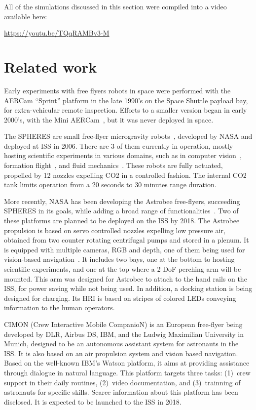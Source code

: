 \documentclass[review]{elsarticle}
\begin{document}
All of the simulations discussed in this section were compiled into a
video available here: \\
\centerline{\url{https://youtu.be/TQqRAMBv3-M}}






\section{Related work}
\label{sec:related-work}

Early experiments with free flyers robots in space were performed with
the AERCam “Sprint” platform in the late 1990’s on the Space Shuttle
payload bay, for extra-vehicular remote inspection. Efforts to a
smaller version began in early 2000’s, with the Mini
AERCam~\cite{wagenknecht03}, but it was never deployed in space.

The SPHERES are small free-flyer microgravity robots~\cite{miller00},
developed by NASA and deployed at ISS in 2006. There are 3 of them
currently in operation, mostly hosting scientific experiments in
various domains, such as in computer vision~\cite{tweddle12},
formation flight~\cite{eslinger13}, and fluid
mechanics~\cite{burke10}. These robots are fully actuated, propelled
by 12 nozzles expelling CO2 in a controlled fashion. The internal CO2
tank limits operation from a 20 seconds to 30 minutes range duration.

More recently, NASA has been developing the Astrobee free-flyers,
succeeding SPHERES in its goals, while adding a broad range of
functionalities~\cite{bualat15}. Two of these platforms are planned to be deployed on
the ISS by 2018. The Astrobee propulsion is based on servo controlled
nozzles expelling low pressure air, obtained from two counter rotating
centrifugal pumps and stored in a plenum. It is equipped with multiple
cameras, RGB and depth, one of them being used for vision-based
navigation~\cite{coltin16}. It includes two bays, one at the bottom to hosting
scientific experiments, and one at the top where a 2 DoF perching arm
will be mounted. This arm was designed for Astrobee to attach to the
hand rails on the ISS, for power saving while not being used. In
addition, a docking station is being designed for charging. Its HRI is
based on stripes of colored LEDs conveying information to the human
operators.

CIMON (Crew Interactive Mobile CompanioN) is an European free-flyer
being developed by DLR, Airbus DS, IBM, and the Ludwig Maximilian
University in Munich, designed to be an autonomous assistant system
for astronauts in the ISS. It is also based on an air propulsion
system and vision based navigation.  Based on the well-known IBM's
Watson platform, it aims at providing assistance through dialogue in
natural language. This platform targets three tasks: (1)~crew support
in their daily routines, (2)~video documentation, and (3)~trainning of
astronauts for specific skills. Scarce information about this platform
has been disclosed. It is expected to be launched to the ISS in 2018.
\end{document}
